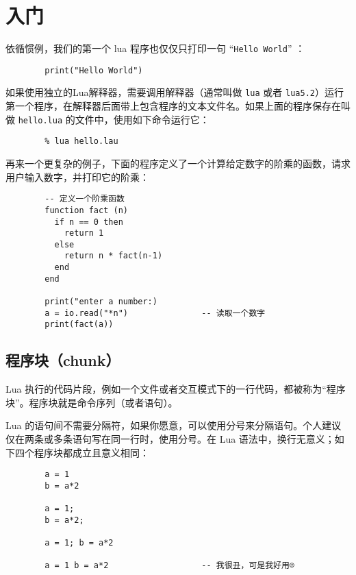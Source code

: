 \chapter{入门}
\setlength{\parindent}{2em}
\small

依循惯例，我们的第一个 lua 程序也仅仅只打印一句 ``\verb|Hello World|'' ：

\begin{verbatim}
        print("Hello World")
\end{verbatim}

如果使用独立的Lua解释器，需要调用解释器（通常叫做 \verb|lua| 或者 \verb|lua5.2|）运行第一个程序，在解释器后面带上包含程序的文本文件名。如果上面的程序保存在叫做 \verb|hello.lua| 的文件中，使用如下命令运行它：

\begin{verbatim}
        % lua hello.lau
\end{verbatim}

再来一个更复杂的例子，下面的程序定义了一个计算给定数字的阶乘的函数，请求用户输入数字，并打印它的阶乘：

\begin{verbatim}
        -- 定义一个阶乘函数
        function fact (n)
          if n == 0 then
            return 1
          else
            return n * fact(n-1)
          end
        end

        print("enter a number:)
        a = io.read("*n")               -- 读取一个数字
        print(fact(a))
\end{verbatim}

\section{程序块（chunk）}

Lua 执行的代码片段，例如一个文件或者交互模式下的一行代码，都被称为``程序块''。程序块就是命令序列（或者语句）。

Lua 的语句间不需要分隔符，如果你愿意，可以使用分号来分隔语句。个人建议仅在两条或多条语句写在同一行时，使用分号。在 Lua 语法中，换行无意义；如下四个程序块都成立且意义相同：

\begin{verbatim}
        a = 1
        b = a*2

        a = 1;
        b = a*2;

        a = 1; b = a*2

        a = 1 b = a*2                   -- 我很丑，可是我好用☺
\end{verbatim}

